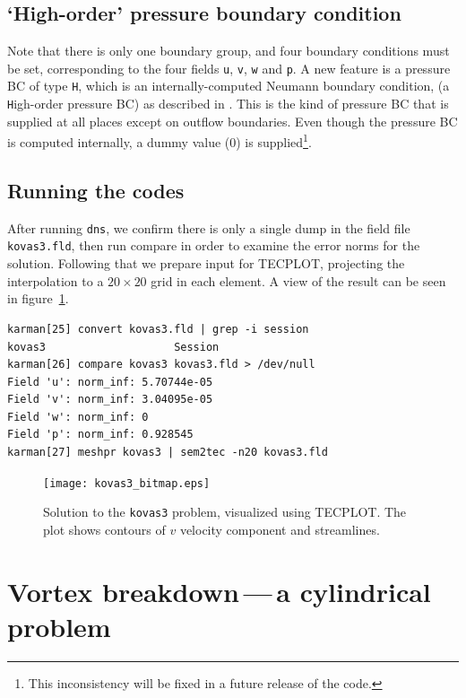 \documentclass[11pt,a4paper]{report}
\begin{document}
\subsection{`High-order' pressure boundary condition}

Note that there is only one boundary group, and four boundary
conditions must be set, corresponding to the four fields \verb+u+,
\verb+v+, \verb+w+ and \verb+p+.  A new feature is a pressure BC of
type \verb+H+, which is an internally-computed Neumann boundary
condition, (a \verb+H+igh-order pressure BC) as described in
\citet{kio91}.  This is the kind of pressure BC that is supplied
at all places except on outflow boundaries.  Even though the pressure
BC is computed internally, a dummy value (0) is supplied\footnote{This
inconsistency will be fixed in a future release of the code.}.

\subsection{Running the codes}

After running \verb+dns+, we confirm there is only a single dump in the
field file \verb+kovas3.fld+, then run compare in order to examine the
error norms for the solution.  Following that we prepare input for
TECPLOT, projecting the interpolation to a $20\times20$ grid in each
element.  A view of the result can be seen in figure~\ref{kov3soln}.
{\small
\begin{verbatim}
karman[25] convert kovas3.fld | grep -i session
kovas3                    Session
karman[26] compare kovas3 kovas3.fld > /dev/null
Field 'u': norm_inf: 5.70744e-05
Field 'v': norm_inf: 3.04095e-05
Field 'w': norm_inf: 0
Field 'p': norm_inf: 0.928545
karman[27] meshpr kovas3 | sem2tec -n20 kovas3.fld
\end{verbatim}
}
\begin{figure}
\begin{center}
\texttt{[image: kovas3\_bitmap.eps]}
\end{center}
\caption{
\label{kov3soln}
  Solution to the \texttt{kovas3} problem, visualized using TECPLOT.
  The plot shows contours of $v$ velocity component and streamlines.
  }
\end{figure}

\section{Vortex breakdown\,---\,a cylindrical problem}
\end{document}
